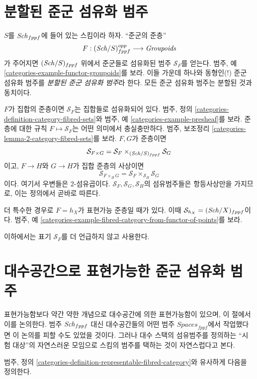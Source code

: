 \section{분할된 준군 섬유화 범주}
\label{section-split}

\noindent
$S$를 $\mathit{Sch}_{fppf}$에 들어 있는 스킴이라 하자. ``준군의 준층''
$$
F : (\mathit{Sch}/S)_{fppf}^{opp} \longrightarrow \textit{Groupoids}
$$
가 주어지면 $(\mathit{Sch}/S)_{fppf}$ 위에서 준군들로 섬유화된 범주
$\mathcal{S}_F$를 얻는다. 범주, 예
\ref{categories-example-functor-groupoids}를 보라. 이들 가운데 하나와
동형인(!) 준군 섬유화 범주를 {\it 분할된 준군 섬유화 범주}라 한다.
모든 준군 섬유화 범주는 분할된 것과 동치이다.

\medskip\noindent
$F$가 집합의 준층이면 $\mathcal{S}_F$는 집합들로 섬유화되어 있다.
범주, 정의 \ref{categories-definition-category-fibred-sets}와 범주, 예
\ref{categories-example-presheaf}를 보라. 준층에 대한 규칙
$F \mapsto \mathcal{S}_F$는 어떤 의미에서 충실충만하다. 범주, 보조정리
\ref{categories-lemma-2-category-fibred-sets}를 보라. $F, G$가 준층이면
$$
\mathcal{S}_{F \times G}
=
\mathcal{S}_F \times_{(\mathit{Sch}/S)_{fppf}} \mathcal{S}_G
$$
이고, $F \to H$와 $G \to H$가 집합 준층의 사상이면
$$
\mathcal{S}_{F \times_H G} =
\mathcal{S}_F \times_{\mathcal{S}_H} \mathcal{S}_G
$$
이다. 여기서 우변들은 $2$-섬유곱이다.
$\mathcal{S}_F, \mathcal{S}_G, \mathcal{S}_H$의 섬유범주들은
항등사상만을 가지므로,
이는 정의에서 곧바로 따른다.

\medskip\noindent
더 특수한 경우로 $F = h_X$가 표현가능 준층일 때가 있다. 이때
$\mathcal{S}_{h_X} = (\mathit{Sch}/X)_{fppf}$이다. 범주, 예
\ref{categories-example-fibred-category-from-functor-of-points}를 보라.

\medskip\noindent
이하에서는 표기 $\mathcal{S}_F$를 더 언급하지 않고 사용한다.




\section{대수공간으로 표현가능한 준군 섬유화 범주}
\label{section-representable-by-algebraic-spaces}

\noindent
표현가능함보다 약간 약한 개념으로 대수공간에 의한 표현가능함이 있으며,
이 절에서 이를 논의한다. 범주 $\mathit{Sch}_{fppf}$ 대신 대수공간들의 어떤 범주
$\textit{Spaces}_{fppf}$에서 작업했다면 이 논의를 피할 수도 있었을 것이다.
그러나 대수 스택의 섬유범주를 정의하는 ``시험 대상''의 자연스러운 모임으로
스킴의 범주를 택하는 것이 자연스럽다고 본다.

\medskip\noindent
범주, 정의 \ref{categories-definition-representable-fibred-category}와
유사하게 다음을 정의한다.


